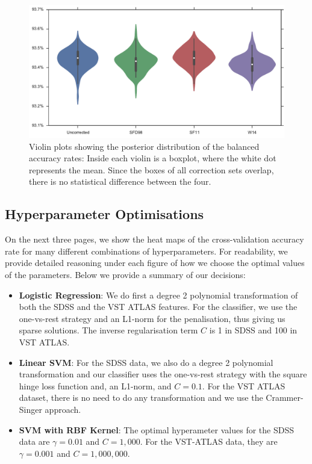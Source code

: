 \begin{figure}[tbp]
	\centering
	\includegraphics[width=\textwidth]{figures/4_expt1/violin_reddening_correction}
	\caption[Accuracy rates with four reddening correction sets]{Violin plots
		showing the posterior distribution of the balanced accuracy rates: Inside each
		violin is a boxplot, where the white dot represents the mean. Since the boxes of
		all correction sets overlap, there is no statistical difference between the four.}
	\label{fig:reddeningviolin}
\end{figure}

\subsection{Hyperparameter Optimisations}
\label{sub:hyper}

On the next three pages, we show the heat maps of the cross-validation accuracy rate
for many different combinations of hyperparameters. For readability, we provide detailed
reasoning under each figure of how we choose the optimal values of the parameters.
Below we provide a summary of our decisions:
\begin{itemize}
	\item \textbf{Logistic Regression}: We do first a degree 2 polynomial transformation of both
	the SDSS and the VST ATLAS features. For the classifier, we use the one-vs-rest
	strategy and an L1-norm for the penalisation, thus giving us sparse solutions. The inverse
	regularisation term $C$ is 1 in SDSS and 100 in VST ATLAS.
	\item \textbf{Linear SVM}: For the SDSS data, we also do a degree 2 polynomial transformation
	and our classifier uses the one-vs-rest strategy with the square hinge loss function
	and, an L1-norm, and $C=0.1$. For the VST ATLAS dataset, there is no need to do 
	any transformation and we use the Crammer-Singer approach.
	\item \textbf{SVM with RBF Kernel}: The optimal hyperameter values for the SDSS data are
	$\gamma = 0.01$ and $C = 1,000$. For the VST-ATLAS data, they are $\gamma = 0.001$ and
	$C = 1,000,000$.
\end{itemize}

